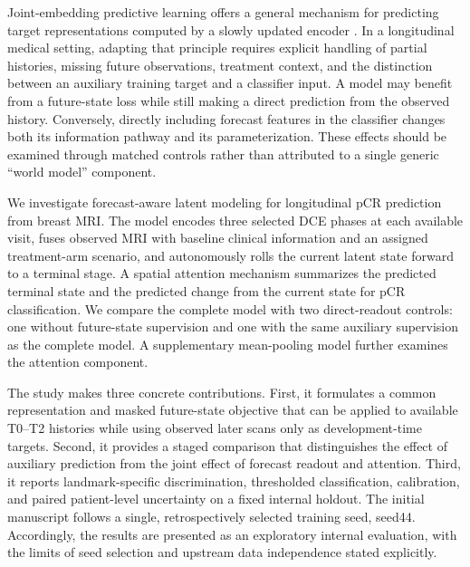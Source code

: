 Joint-embedding predictive learning offers a general mechanism for predicting target representations computed by a slowly updated encoder \citep{jepa2023}. In a longitudinal medical setting, adapting that principle requires explicit handling of partial histories, missing future observations, treatment context, and the distinction between an auxiliary training target and a classifier input. A model may benefit from a future-state loss while still making a direct prediction from the observed history. Conversely, directly including forecast features in the classifier changes both its information pathway and its parameterization. These effects should be examined through matched controls rather than attributed to a single generic ``world model'' component.

We investigate forecast-aware latent modeling for longitudinal pCR prediction from breast MRI. The model encodes three selected DCE phases at each available visit, fuses observed MRI with baseline clinical information and an assigned treatment-arm scenario, and autonomously rolls the current latent state forward to a terminal stage. A spatial attention mechanism summarizes the predicted terminal state and the predicted change from the current state for pCR classification. We compare the complete model with two direct-readout controls: one without future-state supervision and one with the same auxiliary supervision as the complete model. A supplementary mean-pooling model further examines the attention component.

The study makes three concrete contributions. First, it formulates a common representation and masked future-state objective that can be applied to available T0--T2 histories while using observed later scans only as development-time targets. Second, it provides a staged comparison that distinguishes the effect of auxiliary prediction from the joint effect of forecast readout and attention. Third, it reports landmark-specific discrimination, thresholded classification, calibration, and paired patient-level uncertainty on a fixed internal holdout. The initial manuscript follows a single, retrospectively selected training seed, seed44. Accordingly, the results are presented as an exploratory internal evaluation, with the limits of seed selection and upstream data independence stated explicitly.
